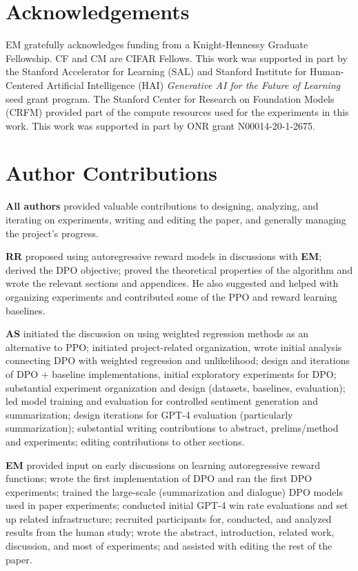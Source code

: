 \documentclass{article}
\begin{document}
\section*{Acknowledgements}
EM gratefully acknowledges funding from a Knight-Hennessy Graduate Fellowship. CF and CM are CIFAR Fellows. This work was supported in part by the Stanford Accelerator for Learning (SAL) and Stanford Institute for Human-Centered Artificial Intelligence (HAI) \textit{Generative AI for the Future of Learning} seed grant program. The Stanford Center for Research on Foundation Models (CRFM) provided part of the compute resources used for the experiments in this work. This work was supported in part by ONR grant N00014-20-1-2675.











\newpage
\appendix
\section*{Author Contributions}
\textbf{All authors} provided valuable contributions to designing, analyzing, and iterating on experiments, writing and editing the paper, and generally managing the project’s progress.

\textbf{RR} proposed using autoregressive reward models in discussions with \textbf{EM}; derived the DPO objective; proved the theoretical properties of the algorithm and wrote the relevant sections and appendices. He also suggested and helped with organizing experiments and contributed some of the PPO and reward learning baselines.

\textbf{AS} initiated the discussion on using weighted regression methods as an alternative to PPO;
initiated project-related organization, wrote initial analysis connecting DPO with weighted regression and unlikelihood; design and iterations of DPO + baseline implementations, initial exploratory experiments for DPO; substantial experiment organization and design (datasets, baselines, evaluation); led model training and evaluation for controlled sentiment generation and summarization; design iterations for GPT-4 evaluation (particularly summarization); substantial writing contributions to abstract, prelims/method and experiments; editing contributions to other sections.

\textbf{EM} provided input on early discussions on learning autoregressive reward functions; wrote the first implementation of DPO and ran the first DPO experiments; trained the large-scale (summarization and dialogue) DPO models used in paper experiments; conducted initial GPT-4 win rate evaluations and set up related infrastructure; recruited participants for, conducted, and analyzed results from the human study; wrote the abstract, introduction, related work, discussion, and most of experiments; and assisted with editing the rest of the paper.
\end{document}
